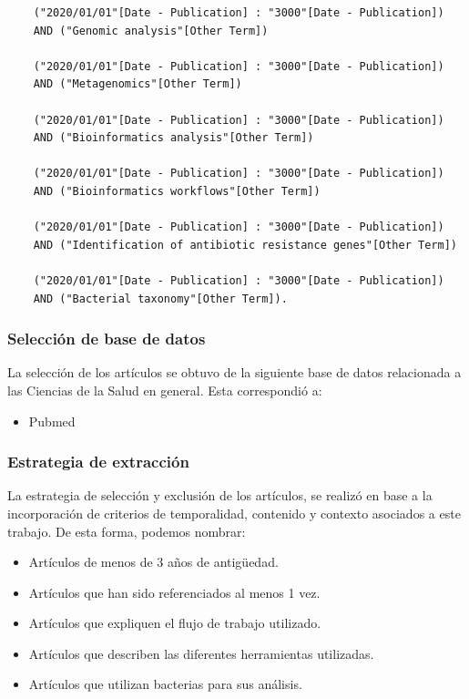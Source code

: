 \documentclass[12pt]{article}
\begin{document}
\begin{verbatim}
    ("2020/01/01"[Date - Publication] : "3000"[Date - Publication]) 
    AND ("Genomic analysis"[Other Term])

    ("2020/01/01"[Date - Publication] : "3000"[Date - Publication]) 
    AND ("Metagenomics"[Other Term])

    ("2020/01/01"[Date - Publication] : "3000"[Date - Publication]) 
    AND ("Bioinformatics analysis"[Other Term])

    ("2020/01/01"[Date - Publication] : "3000"[Date - Publication]) 
    AND ("Bioinformatics workflows"[Other Term])

    ("2020/01/01"[Date - Publication] : "3000"[Date - Publication]) 
    AND ("Identification of antibiotic resistance genes"[Other Term])

    ("2020/01/01"[Date - Publication] : "3000"[Date - Publication]) 
    AND ("Bacterial taxonomy"[Other Term]).
\end{verbatim}

\subsubsection*{Selección de base de datos}

La selección de los artículos se obtuvo de la siguiente 
base de datos relacionada a las Ciencias de la Salud en general.
Esta correspondió a:

\begin{itemize}
    \item Pubmed
\end{itemize}

\subsubsection*{Estrategia de extracción}

La estrategia de selección y exclusión de los artículos, se 
realizó en base a la incorporación de  criterios de temporalidad, 
contenido y contexto asociados a este trabajo. De esta forma, 
podemos nombrar:

\begin{itemize}
    \item Artículos de menos de 3 años de antigüedad.
    \item Artículos que han sido referenciados al menos 1 vez.
    \item Artículos que expliquen el flujo de trabajo utilizado.
    \item Artículos que describen las diferentes herramientas utilizadas.
    \item Artículos que utilizan bacterias para sus análisis.
\end{itemize}
\end{document}
